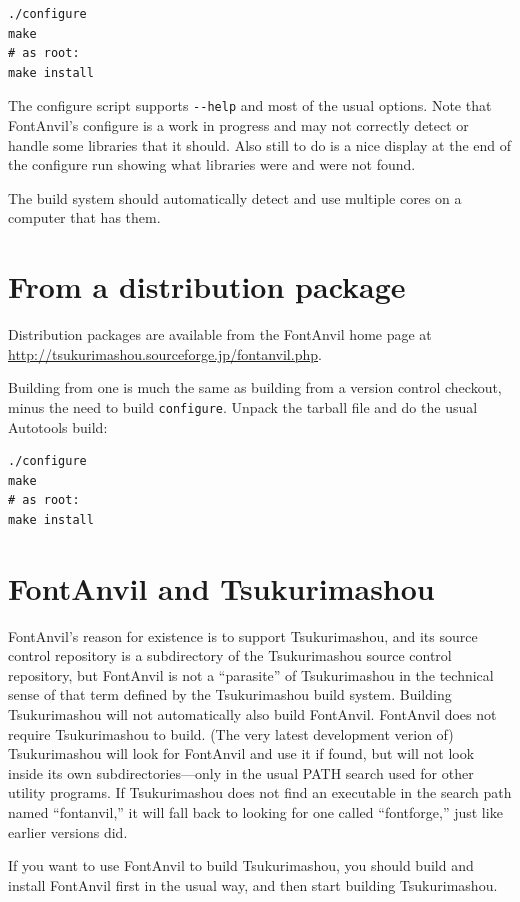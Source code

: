 \documentclass[11pt]{report}
\begin{document}
\begin{verbatim}
./configure
make
# as root:
make install
\end{verbatim}

The configure script supports \texttt{-{}-help} and most of the usual
options.
Note that FontAnvil's configure is a work in progress and may not correctly
detect or handle some libraries that it should.  Also still to do is a nice
display at the end of the configure run showing what libraries were and were
not found.

The build system should automatically detect and use multiple cores on a
computer that has them.

\section{From a distribution package}

Distribution packages are available from the FontAnvil home page at
\url{http://tsukurimashou.sourceforge.jp/fontanvil.php}.

Building from one is much the same as building from a version control
checkout, minus the need to build \texttt{configure}.  Unpack the tarball
file and do the usual Autotools build:

\begin{verbatim}
./configure
make
# as root:
make install
\end{verbatim}

\section{FontAnvil and Tsukurimashou}

FontAnvil's reason for existence is to support Tsukurimashou, and its source
control repository is a subdirectory of the Tsukurimashou source control
repository, but FontAnvil is not a ``parasite'' of Tsukurimashou in the
technical sense of that term defined by the Tsukurimashou build system. 
Building Tsukurimashou will not automatically also build FontAnvil.
FontAnvil does not require Tsukurimashou to build.  (The very latest
development verion of) Tsukurimashou will look
for FontAnvil and use it if found, but will not look inside its own
subdirectories---only in the usual PATH search used for other utility
programs.  If Tsukurimashou does not find an executable in the search path
named ``fontanvil,'' it will fall back to looking for one called
``fontforge,'' just like earlier versions did.

If you want to use FontAnvil to build Tsukurimashou, you should build and
install FontAnvil first in the usual way, and then start building
Tsukurimashou.
\end{document}
